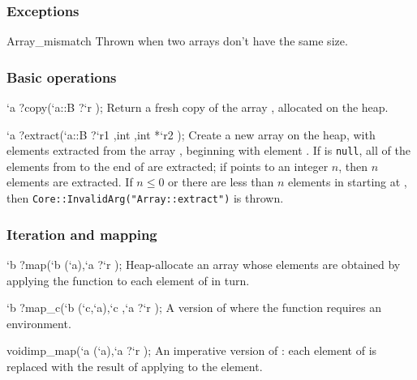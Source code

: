 \subsubsection*{Exceptions}

\begin{deexn}{Array_mismatch}{}
  Thrown when two arrays don't have the same size.
\end{deexn}


\subsubsection*{Basic operations}

\begin{defun2}{`a ?}{copy}{(`a::B {?}`r );}
  Return a fresh copy of the array , allocated on the heap.
\end{defun2}

\begin{defun2}{`a ?}{extract}{(`a::B {?}`r1 ,int ,int *`r2 );}
  Create a new array on the heap, with elements extracted from the
  array , beginning with element .  If
   is \texttt{null}, all of the elements from 
  to the end of  are extracted; if  points to an
  integer $n$, then $n$ elements are extracted.  If $n\leq 0$ or there
  are less than $n$ elements in  starting at ,
  then \texttt{Core::InvalidArg("Array::extract")} is thrown.
\end{defun2}

\subsubsection*{Iteration and mapping}

\begin{defun2}{`b ?}{map}{(`b (`a),`a {?}`r );}
  Heap-allocate an array whose elements are obtained by applying the
  function  to each element of  in turn.
\end{defun2}

\begin{defun2}{`b ?}{map_c}{(`b (`c,`a),`c ,`a {?}`r );}
  A version of  where the function  requires an
  environment.
\end{defun2}

\begin{defun2}{void}{imp_map}{(`a (`a),`a {?}`r );}
  An imperative version of : each element of  is
  replaced with the result of applying  to the element.
\end{defun2}


